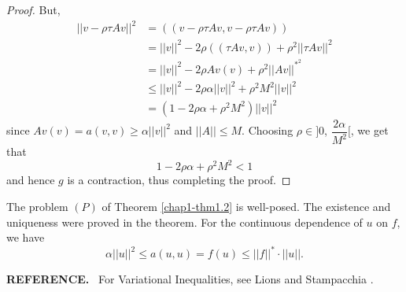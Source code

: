 \begin{proof}
But,
\begin{align*}
||v-\rho \tau Av||^{2} &= ((v-\rho \tau Av, v-\rho \tau Av))\\
&= ||v||^{2}-2\rho((\tau Av,v))+\rho^{2}||\tau Av||^{2}\\
&= ||v||^{2}-2\rho Av(v)+\rho^{2}||Av||^{\ast^2}\\
&\leq ||v||^{2}-2\rho\alpha||v||^{2}+\rho^{2}M^{2}||v||^{2}\\
&= (1-2\rho\alpha+\rho^{2}M^{2})||v||^{2}
\end{align*}
since $Av(v)=a(v,v)\geq \alpha||v||^{2}$ and $||A||\leq M$. Choosing
$\rho\in ]0$, $\dfrac{2\alpha}{M^{2}}[$, we get that
\begin{equation*}
1-2\rho\alpha+\rho^{2}M^{2}<1\tag{1.18}\label{chap1-eq1.18}
\end{equation*}
and hence $g$ is a contraction, thus completing the proof.
\end{proof}

\begin{remark}\label{chap1-rem1.5}
The problem $(P)$ of Theorem \ref{chap1-thm1.2} is well-posed. The
existence and uniqueness were proved in the theorem. For the
continuous dependence of $u$ on $f$, we have
\begin{equation*}
\alpha||u||^{2}\leq a(u,u)=f(u)\leq ||f||^{\ast}\cdot
||u||.\tag{1.19}\label{chap1-eq1.19} 
\end{equation*}\pageoriginale
\end{remark}

\medskip
\noindent
{\bf REFERENCE.}~ For Variational Inequalities, see Lions and
Stampacchia \cite{key18}. 

